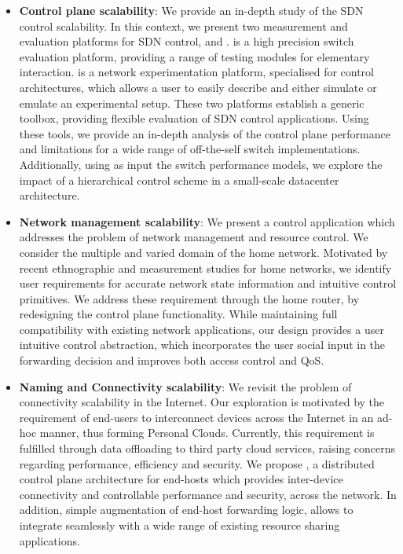 \begin{itemize}
  \item \textbf{Control plane scalability}: We provide an in-depth study of the
    SDN control scalability. In this context, we present two measurement and
    evaluation platforms for SDN control, \oflops and \sdnsim. \oflops is a
    high precision switch evaluation platform, providing a range of testing
    modules for elementary \of interaction. \sdnsim is a network experimentation
    platform, specialised for \of control architectures, which allows a user to
    easily describe and either simulate or emulate an experimental setup. These two
    platforms establish a generic toolbox, providing flexible evaluation of
    SDN control applications. Using these tools, we provide an in-depth
    analysis of the control plane performance and limitations for a  wide
    range of off-the-self \of switch implementations. Additionally, using as
    input the \oflops switch performance models, we explore the impact of a
    hierarchical control  scheme in a small-scale datacenter architecture. 
 
  \item \textbf{Network management scalability}: We present a control application which
    addresses the problem of network management and resource control. We
    consider the multiple and varied domain of the home network.  Motivated by
    recent ethnographic and measurement studies for home networks, we identify
    user requirements for accurate network state information and intuitive
    control primitives. We address these requirement through the home router, by
    redesigning the control plane functionality.  While maintaining full
    compatibility with existing network applications, our design provides a user
    intuitive control abstraction, which incorporates the user social input in
    the forwarding decision and improves both access control and  QoS.

  \item \textbf{Naming and Connectivity scalability}: We revisit the problem of
    connectivity scalability in the Internet.  Our exploration is motivated by
    the requirement of end-users to interconnect devices across the Internet in
    an ad-hoc manner, thus forming Personal Clouds. Currently, this requirement
    is fulfilled through data offloading to third party cloud services, raising
    concerns regarding performance, efficiency and security.  We propose
    \signpost, a distributed control plane architecture for end-hosts which
    provides inter-device connectivity and controllable performance and
    security, across the network. In addition, simple augmentation of end-host forwarding
    logic, allows \signpost to integrate seamlessly with a wide range of
    existing resource sharing applications.
\end{itemize}

